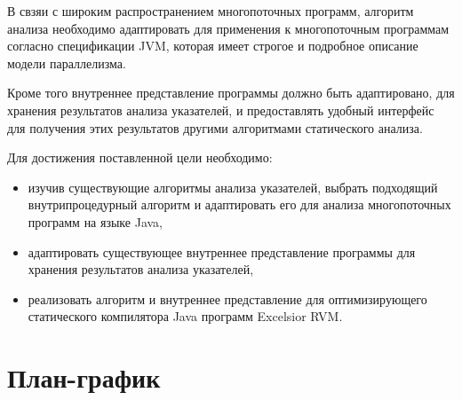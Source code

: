 \documentclass[14pt,titlepage]{extarticle}
\newcommand{\eng}[1]{{\English#1}}
\begin{document}
    В свзяи с широким распространением многопоточных программ,
    алгоритм анализа необходимо адаптировать для применения к
    многопоточным программам согласно спецификации JVM, которая имеет
    строгое и подробное описание модели параллелизма.

    Кроме того внутреннее представление программы должно быть адаптировано,
    для хранения результатов анализа указателей, и предоставлять удобный
    интерфейс для получения этих результатов другими алгоритмами статического
    анализа.

    Для достижения поставленной цели необходимо:
    \begin{itemize}
      \item изучив существующие алгоритмы анализа указателей, выбрать
            подходящий внутрипроцедурный алгоритм и адаптировать его
            для анализа многопоточных программ на языке Java,
      \item адаптировать существующее внутреннее представление программы для
            хранения результатов анализа указателей,
      \item реализовать алгоритм и внутреннее представление для оптимизирующего
            статического компилятора Java программ \eng{Excelsior RVM}.
    \end{itemize}

  \newpage
  

  \newpage
  \thispagestyle{empty}
  \pagestyle{empty}
  \section*{План-график}
\end{document}
